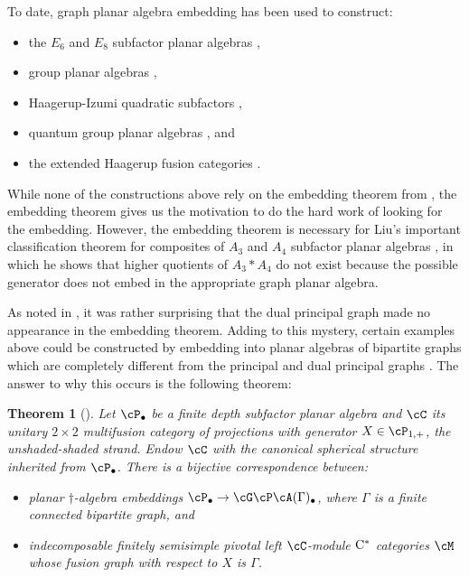 \documentclass[11pt]{article}
\theoremstyle{plain}
\newtheorem{thm}{Theorem}[section]
\theoremstyle{definition}
\newcommand{\Cstar}{\rm{C^*}}
\begin{document}
To date, graph planar algebra embedding has been used to construct:
\begin{itemize}
\item
the $E_6$ and $E_8$ subfactor planar algebras \cite{MR1929335},
\item
group planar algebras \cite{MR2511128},
\item
Haagerup-Izumi quadratic subfactors \cite{MR2679382,MR2822034,MR3314808,MR3394622,MR3402358},
\item
quantum group planar algebras \cite{MR3306607}, and
\item
the extended Haagerup fusion categories \cite{MR2979509,1810.06076}.
\end{itemize}
While none of the constructions above rely on the embedding theorem from \cite{MR2812459},
the embedding theorem gives us the motivation to do the hard work of looking for the embedding.
However, the embedding theorem is necessary for Liu's important classification theorem for composites of $A_3$ and $A_4$ subfactor planar algebras \cite{MR3345186}, in which he shows that higher quotients of $A_3*A_4$ do not exist because the possible generator does not embed in the appropriate graph planar algebra.

As noted in \cite{MR2812459}, it was rather surprising that the dual principal graph made no appearance in the embedding theorem.
Adding to this mystery, certain examples above could be constructed by embedding into planar algebras of bipartite graphs which are completely different from the principal and dual principal graphs \cite{MR2679382,MR3402358,1810.06076}.
The answer to why this occurs is the following theorem:

\begin{thm}[\cite{1810.06076}]
Let $\cP_\bullet$ be a finite depth subfactor planar algebra and $\cC$ its unitary $2\times 2$ multifusion category of projections with generator $X \in \cP_{1,+}$, the unshaded-shaded strand.
Endow $\cC$ with the canonical spherical structure inherited from $\cP_\bullet$.
There is a bijective correspondence between:
\begin{itemize}
\item
planar $\dag$-algebra embeddings $\cP_\bullet \to \cG\cP\cA(\Gamma)_\bullet$, where $\Gamma$ is a finite connected bipartite graph, and 
\item
indecomposable finitely semisimple pivotal left $\cC$-module $\Cstar$ categories $\cM$ whose fusion graph with respect to $X$ is $\Gamma$.
\end{itemize}
\end{thm}
\end{document}
